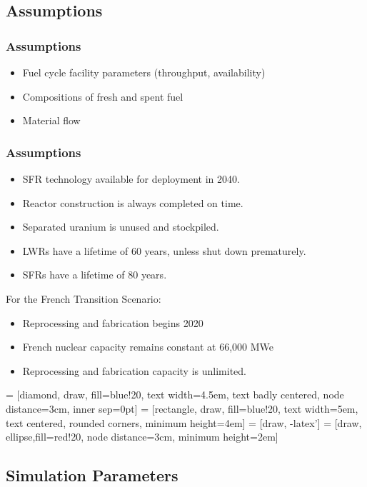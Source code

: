 \subsection{Assumptions}

\begin{frame}
	\frametitle{Assumptions}
	\begin{itemize}
		\item Fuel cycle facility parameters (throughput, availability)
		\item Compositions of fresh and spent fuel
		\item Material flow
	\end{itemize}
\end{frame}

\begin{frame}
	\frametitle{Assumptions}
	\begin{itemize}
		\item SFR technology available for deployment in 2040.
		\item Reactor construction is always completed on time.
		\item Separated uranium is unused and stockpiled.
		\item LWRs have a lifetime of 60 years, unless shut down prematurely.
		\item SFRs have a lifetime of 80 years.
	\end{itemize}
	For the French Transition Scenario:
	\begin{itemize}
		\item Reprocessing and fabrication begins 2020
		\item French nuclear capacity remains constant at 66,000 MWe
		\item Reprocessing and fabrication capacity is unlimited.
	\end{itemize}
\end{frame}


 = [diamond, draw, fill=blue!20, 
text width=4.5em, text badly centered, node distance=3cm, inner sep=0pt]
 = [rectangle, draw, fill=blue!20, 
text width=5em, text centered, rounded corners, minimum height=4em]
 = [draw, -latex']
 = [draw, ellipse,fill=red!20, node distance=3cm,
minimum height=2em]

\subsection{Simulation Parameters}

